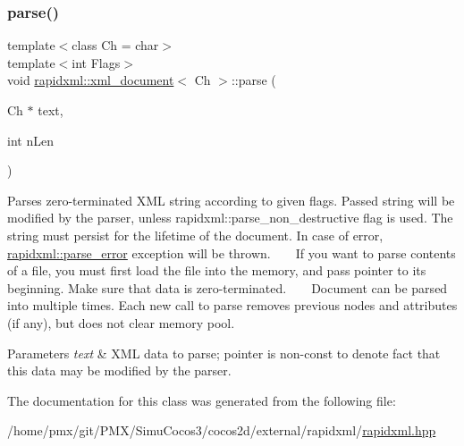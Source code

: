 \subsubsection{\texorpdfstring{parse()}{parse()}}
{\footnotesize\ttfamily template$<$class Ch  = char$>$ \\
template$<$int Flags$>$ \\
void \hyperlink{classrapidxml_1_1xml__document}{rapidxml\+::xml\+\_\+document}$<$ Ch $>$\+::parse (\begin{DoxyParamCaption}\item[{Ch $\ast$}]{text,  }\item[{int}]{n\+Len }\end{DoxyParamCaption})\hspace{0.3cm}{\ttfamily [inline]}}

Parses zero-\/terminated X\+ML string according to given flags. Passed string will be modified by the parser, unless rapidxml\+::parse\+\_\+non\+\_\+destructive flag is used. The string must persist for the lifetime of the document. In case of error, \hyperlink{classrapidxml_1_1parse__error}{rapidxml\+::parse\+\_\+error} exception will be thrown. ~\newline
~\newline
 If you want to parse contents of a file, you must first load the file into the memory, and pass pointer to its beginning. Make sure that data is zero-\/terminated. ~\newline
~\newline
 Document can be parsed into multiple times. Each new call to parse removes previous nodes and attributes (if any), but does not clear memory pool. 
\begin{DoxyParams}{Parameters}
{\em text} & X\+ML data to parse; pointer is non-\/const to denote fact that this data may be modified by the parser. \\
\hline
\end{DoxyParams}


The documentation for this class was generated from the following file\+:\begin{DoxyCompactItemize}
\item 
/home/pmx/git/\+P\+M\+X/\+Simu\+Cocos3/cocos2d/external/rapidxml/\hyperlink{rapidxml_8hpp}{rapidxml.\+hpp}\end{DoxyCompactItemize}
